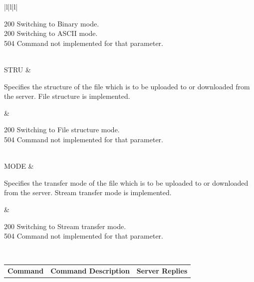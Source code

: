 \documentclass[10pt,twocolumn]{witseiepaper}
\begin{document}
\begin{appendix}
\begin{table}[h]
\begin{tabular}{|l|l|l|}
	{\raggedright 200 Switching to Binary mode. \\ 200 Switching to ASCII mode. \\ 504 Command not implemented for that parameter.} \\ 
	\hline 
	STRU & 
	{\raggedright Specifies the structure of the file which is to be uploaded to or downloaded from the server.  File structure is implemented. } &  
	{\raggedright 200 Switching to File structure mode.  \\ 504 Command not implemented for that parameter.} \\ 
	\hline 
	MODE & 
	{\raggedright Specifies the transfer mode of the file which is to be uploaded to or downloaded from the server.  Stream transfer mode is implemented.} &  
	{\raggedright 200 Switching to Stream transfer mode.  \\ 504 Command not implemented for that parameter.} \\ 

	\hline 
	

\end{tabular}
\end{table}


\begin{tabular}{|l|l|l|}
	
	\hline
	\textbf{Command} & \textbf{Command Description} & \textbf{Server Replies} \\ 
	

\end{tabular}
\end{appendix}
\end{document}
